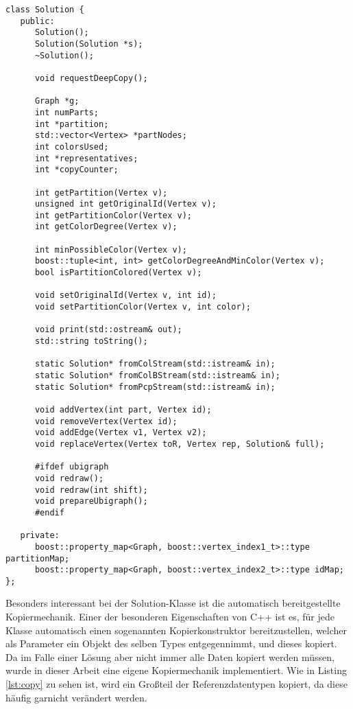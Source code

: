 \singlespacing
\lstset{style=customc}
\begin{lstlisting}[caption={Signatur der Solutionklasse},label=lst:solution]
class Solution {
   public:
      Solution();
      Solution(Solution *s);
      ~Solution();
      
      void requestDeepCopy();

      Graph *g;
      int numParts;
      int *partition;
      std::vector<Vertex> *partNodes;
      int colorsUsed;
      int *representatives;
      int *copyCounter;
      
      int getPartition(Vertex v);
      unsigned int getOriginalId(Vertex v);
      int getPartitionColor(Vertex v);
      int getColorDegree(Vertex v);
      
      int minPossibleColor(Vertex v);
      boost::tuple<int, int> getColorDegreeAndMinColor(Vertex v);
      bool isPartitionColored(Vertex v);
      
      void setOriginalId(Vertex v, int id);
      void setPartitionColor(Vertex v, int color);
      
      void print(std::ostream& out);
      std::string toString();
      
      static Solution* fromColStream(std::istream& in);
      static Solution* fromColBStream(std::istream& in);
      static Solution* fromPcpStream(std::istream& in);
      
      void addVertex(int part, Vertex id);
      void removeVertex(Vertex id);
      void addEdge(Vertex v1, Vertex v2);
      void replaceVertex(Vertex toR, Vertex rep, Solution& full);
      
      #ifdef ubigraph
      void redraw();
      void redraw(int shift);
      void prepareUbigraph();
      #endif
      
   private:
      boost::property_map<Graph, boost::vertex_index1_t>::type partitionMap;
      boost::property_map<Graph, boost::vertex_index2_t>::type idMap;
};
\end{lstlisting}

Besonders interessant bei der Solution-Klasse ist die automatisch bereitgestellte Kopiermechanik. Einer der besonderen Eigenschaften von C++ ist es, für jede Klasse automatisch einen sogenannten Kopierkonstruktor
bereitzustellen, welcher als Parameter ein Objekt des selben Types entgegennimmt, und dieses kopiert. Da im Falle einer Lösung aber nicht immer alle Daten kopiert werden müssen, wurde in dieser Arbeit eine
eigene Kopiermechanik implementiert. Wie in Listing \ref{lst:copy} zu sehen ist, wird ein Großteil der Referenzdatentypen kopiert, da diese häufig garnicht verändert werden. 


